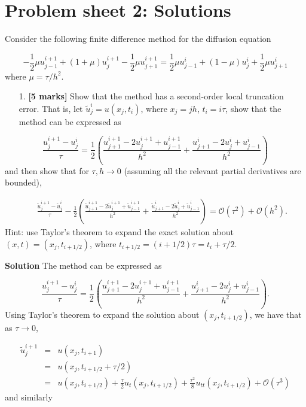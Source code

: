 \documentclass[12pt,a4paper]{article}
\begin{document}
\section{Problem sheet 2: Solutions}
Consider the following finite difference method for the diffusion equation

\[
-\frac{1}{2}\mu u^{i+1}_{j-1} + (1 + \mu)u^{i+1}_j -\frac{1}{2}\mu u^{i+1}_{j+1} = 
\frac{1}{2}\mu u^{i}_{j-1} + (1 - \mu)u^{i}_j +\frac{1}{2}\mu u^{i}_{j+1} 
\]
where $\mu = \tau/h^2$.

\begin{itemize}
\item[1. ] \textbf{[5 marks]} Show that the method has a second-order local truncation error. That is, let $\tilde{u}^i_j = u(x_j,t_i)$, where $x_j = jh$, $t_i = i\tau$, show that the method can be expressed as

\end{itemize}
\[
\frac{u^{i+1}_j - u^i_j}{\tau} = \frac{1}{2}\left( \frac{u^{i+1}_{j+1} - 2u^{i+1}_{j} + u^{i+1}_{j-1}}{h^2} + \frac{u^{i}_{j+1} - 2u^{i}_{j} + u^{i}_{j-1}}{h^2}   \right)
\]
and then show that for $\tau, h \to 0$ (assuming all the relevant partial derivatives are bounded),


\begin{eqnarray*}
&& \frac{\tilde{u}^{i+1}_j - \tilde{u}^i_j}{\tau} - \frac{1}{2}\left( \frac{\tilde{u}^{i+1}_{j+1} - 2\tilde{u}^{i+1}_{j} + \tilde{u}^{i+1}_{j-1}}{h^2} + \frac{\tilde{u}^{i}_{j+1} - 2\tilde{u}^{i}_{j} + \tilde{u}^{i}_{j-1}}{h^2}   \right) = \mathcal{O}(\tau^2) + \mathcal{O}(h^2).
\end{eqnarray*}
Hint: use Taylor's theorem to expand the exact solution about $(x,t) = (x_j,t_{i+1/2})$, where $t_{i+1/2} = (i + 1/2)\tau = t_i + \tau/2$.

\textbf{Solution} The method can be expressed as

\[
\frac{u^{i+1}_j - u^i_j}{\tau} = \frac{1}{2}\left( \frac{u^{i+1}_{j+1} - 2u^{i+1}_{j} + u^{i+1}_{j-1}}{h^2} + \frac{u^{i}_{j+1} - 2u^{i}_{j} + u^{i}_{j-1}}{h^2}   \right).
\]
Using Taylor's theorem to expand the solution about $(x_j, t_{i+1/2})$, we have that as $\tau \to 0$,


\begin{eqnarray*}
\tilde{u}^{i+1}_j  &=& u(x_{j},t_{i+1}) \\
                 &=& u(x_j,t_{i+1/2}+\tau/2) \\
                 &=& u(x_j,t_{i+1/2}) + \frac{\tau}{2}u_t(x_j,t_{i+1/2}) + \frac{\tau^2}{8}u_{tt}(x_j,t_{i+1/2}) + \mathcal{O}(\tau^3)
\end{eqnarray*}
and similarly
\end{document}
